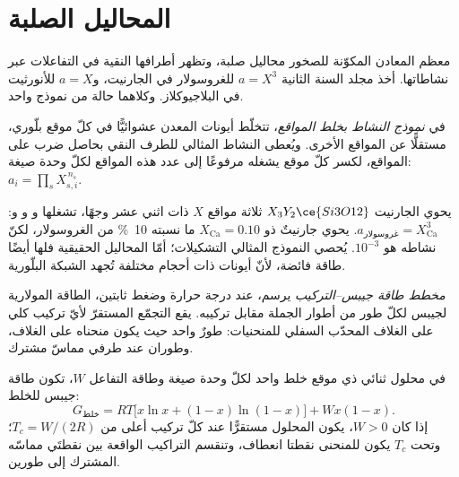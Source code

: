 \section{المحاليل الصلبة}\label{sec:b3:petrological-thermodynamics:solutions}

معظم المعادن المكوّنة للصخور محاليل صلبة، وتظهر أطرافها النقية
في التفاعلات عبر نشاطاتها. أخذ مجلد السنة الثانية $a = X^3$ للغروسولار
في الجارنيت، و$a = X$ للأنورثيت في البلاجيوكلاز.
وكلاهما حالة من نموذج واحد.

\begin{definition}\label{def:b3:petrological-thermodynamics:site-mixing}
في \emph{نموذج النشاط بخلط المواقع}، تتخلّط
أيونات المعدن عشوائيًّا في كلّ موقع بلّوري، مستقلًّا
عن المواقع الأخرى. ويُعطى النشاط المثالي للطرف النقي بحاصل ضرب
على المواقع، لكسر كلّ موقع يشغله مرفوعًا إلى عدد
هذه المواقع لكلّ وحدة صيغة: $a_i = \prod_s X_{s,i}^{\,n_s}$.
\end{definition}

يحوي الجارنيت $X_3Y_2\ce{Si3O12}$ ثلاثة مواقع $X$ ذات اثني عشر وجهًا،
تشغلها  و و و: $a_{\text{غروسولار}} =
X_{\text{Ca}}^3$. يحوي جارنيتٌ ذو $X_{\text{Ca}} = 0.10$ ما نسبته
\qty{10}{\percent} من الغروسولار، لكنّ نشاطه هو $10^{-3}$. يُحصي النموذج المثالي
التشكيلات؛ أمّا المحاليل الحقيقية فلها أيضًا طاقة فائضة،
لأنّ أيونات ذات أحجام مختلفة تُجهد الشبكة البلّورية.

\begin{definition}\label{def:b3:petrological-thermodynamics:gx}
\emph{مخطط طاقة جيبس--التركيب} يرسم، عند درجة حرارة
وضغط ثابتين، الطاقة المولارية لجيبس لكلّ طور من أطوار الجملة
مقابل تركيبه. يقع التجمّع المستقرّ لأيّ تركيب كلي على
الغلاف المحدّب السفلي للمنحنيات: طورٌ واحد حيث يكون منحناه على
الغلاف، وطوران عند طرفي مماسّ مشترك.
\end{definition}

\begin{proposition}\label{prop:b3:petrological-thermodynamics:regular}
في محلول ثنائي ذي موقع خلط واحد لكلّ وحدة صيغة وطاقة التفاعل $W$،
تكون طاقة جيبس للخلط:
\[
  G_{\text{خلط}} = RT\bigl[x\ln x + (1 - x)\ln(1 - x)\bigr] + Wx(1 - x).
\]
إذا كان $W > 0$، يكون المحلول مستقرًّا عند كلّ تركيب أعلى من $T_c =
W/(2R)$؛ وتحت $T_c$ يكون للمنحنى نقطتا انعطاف، وتنقسم التراكيب
الواقعة بين نقطتَي مماسّه المشترك إلى طورين.
\end{proposition}

